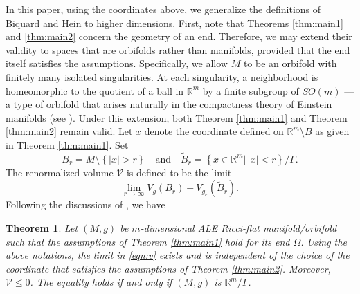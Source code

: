 \documentclass{amsart}
\newtheorem{thm}{Theorem}[section]
\newcommand{\abs}[1]{\left\vert#1\right\vert}
\newcommand{\set}[1]{\left\{#1\right\}}
\newcommand{\Real}{\mathbb R}
\numberwithin{equation}{section}
\begin{document}

In this paper, using the coordinates above, we generalize the definitions of Biquard and Hein to higher dimensions. First, note that Theorems \ref{thm:main1} and \ref{thm:main2} concern the geometry of an end. Therefore, we may extend their validity to spaces that are orbifolds rather than manifolds, provided that the end itself satisfies the assumptions. Specifically, we allow $M$ to be an orbifold with finitely many isolated singularities. At each singularity, a neighborhood is homeomorphic to the quotient of a ball in $\mathbb R^m$ by a finite subgroup of $SO(m)$ — a type of orbifold that arises naturally in the compactness theory of Einstein manifolds (see \cite{anderson, bando1990bubbling}). Under this extension, both Theorem \ref{thm:main1} and Theorem \ref{thm:main2} remain valid. Let $x$ denote the coordinate defined on $\mathbb R^m \setminus B$ as given in Theorem \ref{thm:main1}.
Set
$$
B_r=M \setminus \set{\abs{x}>r} \quad \text{and} \quad \tilde{B}_r = \set{x\in \Real^m | \, \abs{x}<r}/\Gamma.
$$
The renormalized volume $\mathcal V$ is defined to be the limit
\begin{equation}
	\label{eqn:v}
	\lim_{r\to \infty } V_g(B_r)- V_{g_e}(\tilde{B}_r).
\end{equation}
Following the discussions of \cite{biquard2023renormalized}, we have
\begin{thm}
	\label{thm:volume}
	Let $(M,g)$ be $m$-dimensional ALE Ricci-flat manifold/orbifold such that the assumptions of Theorem \ref{thm:main1} hold for its end $\Omega$.  Using the above notations, the limit in \eqref{eqn:v} exists and is independent of the choice of the coordinate that satisfies the assumptions of Theorem \ref{thm:main2}. Moreover, $\mathcal V\leq 0$. The equality holds if and only if $(M,g)$ is $\Real^m/\Gamma$.
\end{thm}
\end{document}
